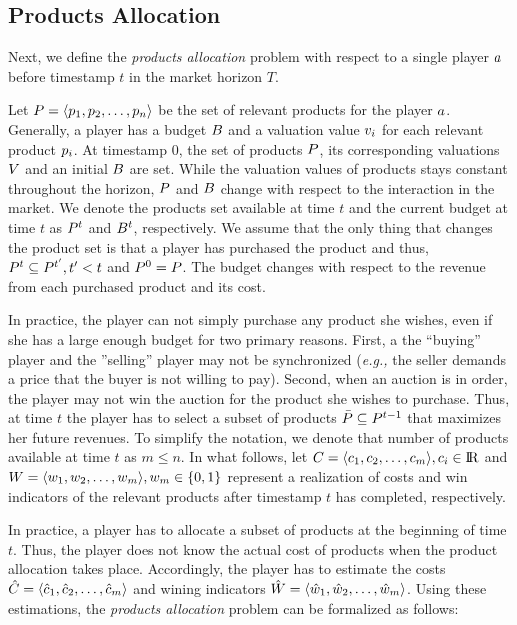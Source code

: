 
\subsection{Products Allocation}

Next, we define the \emph{products allocation} problem with respect to a single player $a$ before timestamp $t$ in the market horizon $T$.

Let $P = \langle p_1, p_2, \dots, p_n\rangle$ be the set of relevant products for the player $a$. Generally, a player has a budget $B$ and a valuation value $v_i$ for each relevant product $p_i$. At timestamp $0$, the set of products $P$, its corresponding valuations $V$ and an initial $B$ are set. While the valuation values of products stays constant throughout the horizon, $P$ and $B$ change with respect to the interaction in the market. We denote the products set available at time $t$ and the current budget at time $t$ as $P^{t}$ and $B^{t}$, respectively. We assume that the only thing that changes the product set is that a player has purchased the product and thus, $P^{t} \subseteq P^{t^{\prime}}, t^{\prime}<t$ and $P^{0} = P$. The budget changes with respect to the revenue from each purchased product and its cost.  

In practice, the player can not simply purchase any product she wishes, even if she has a large enough budget for two primary reasons. First, a the ``buying'' player and the ''selling'' player may not be synchronized (\emph{e.g.,} the seller demands a price that the buyer is not willing to pay). Second, when an auction is in order, the player may not win the auction for the product she wishes to purchase. Thus, at time $t$ the player has to select a subset of products $\bar{P} \subseteq P^{t-1}$ that maximizes her future revenues. To simplify the notation, we denote that number of products available at time $t$ as $m\leq n$. In what follows, let $C = \langle c_1, c_2, \dots, c_{m}\rangle, c_i\in {\rm I\!R}$ and $W = \langle w_1, w_2, \dots, w_m\rangle, w_{m}\in \{0,1\}$ represent a realization of costs and win indicators of the relevant products after timestamp $t$ has completed, respectively.

In practice, a player has to allocate a subset of products at the beginning of time $t$. Thus, the player does not know the actual cost of products when the product allocation takes place. Accordingly, the player has to estimate the costs $\hat{C} = \langle \hat{c}_1, \hat{c}_2, \dots, \hat{c}_m\rangle$ and wining indicators $\hat{W} = \langle \hat{w}_1, \hat{w}_2, \dots, \hat{w}_m\rangle$. Using these estimations, the \emph{products allocation} problem can be formalized as follows:

